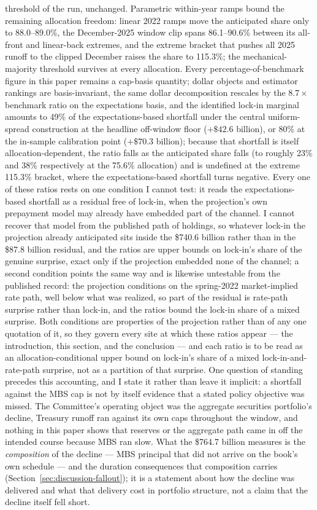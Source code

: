 \documentclass[12pt]{article}
\begin{document}
threshold of the run, unchanged. Parametric within-year ramps bound the remaining allocation freedom: linear 2022 ramps move the anticipated share only to 88.0--89.0\%, the December-2025 window clip spans 86.1--90.6\% between its all-front and linear-back extremes, and the extreme bracket that pushes all 2025 runoff to the clipped December raises the share to 115.3\%; the mechanical-majority threshold survives at every allocation. Every percentage-of-benchmark figure in this paper remains a cap-basis quantity; dollar objects and estimator rankings are basis-invariant, the same dollar decomposition rescales by the $8.7\times$ benchmark ratio on the expectations basis, and the identified lock-in marginal amounts to 49\% of the expectations-based shortfall under the central uniform-spread construction at the headline off-window floor ($+\$42.6$ billion), or 80\% at the in-sample calibration point ($+\$70.3$ billion); because that shortfall is itself allocation-dependent, the ratio falls as the anticipated share falls (to roughly 23\% and 38\% respectively at the 75.6\% allocation) and is undefined at the extreme 115.3\% bracket, where the expectations-based shortfall turns negative. Every one of these ratios rests on one condition I cannot test: it reads the expectations-based shortfall as a residual free of lock-in, when the projection's own prepayment model may already have embedded part of the channel. I cannot recover that model from the published path of holdings, so whatever lock-in the projection already anticipated sits inside the \$740.6 billion rather than in the \$87.8 billion residual, and the ratios are upper bounds on lock-in's share of the genuine surprise, exact only if the projection embedded none of the channel; a second condition points the same way and is likewise untestable from the published record: the projection conditions on the spring-2022 market-implied rate path, well below what was realized, so part of the residual is rate-path surprise rather than lock-in, and the ratios bound the lock-in share of a mixed surprise. Both conditions are properties of the projection rather than of any one quotation of it, so they govern every site at which these ratios appear --- the introduction, this section, and the conclusion --- and each ratio is to be read as an allocation-conditional upper bound on lock-in's share of a mixed lock-in-and-rate-path surprise, not as a partition of that surprise. One question of standing precedes this accounting, and I state it rather than leave it implicit: a shortfall against the MBS cap is not by itself evidence that a stated policy objective was missed. The Committee's operating object was the aggregate securities portfolio's decline, Treasury runoff ran against its own caps throughout the window, and nothing in this paper shows that reserves or the aggregate path came in off the intended course because MBS ran slow. What the \$764.7 billion measures is the \emph{composition} of the decline --- MBS principal that did not arrive on the book's own schedule --- and the duration consequences that composition carries (Section~\ref{sec:discussion-fallout}); it is a statement about how the decline was delivered and what that delivery cost in portfolio structure, not a claim that the decline itself fell short.
\end{document}
